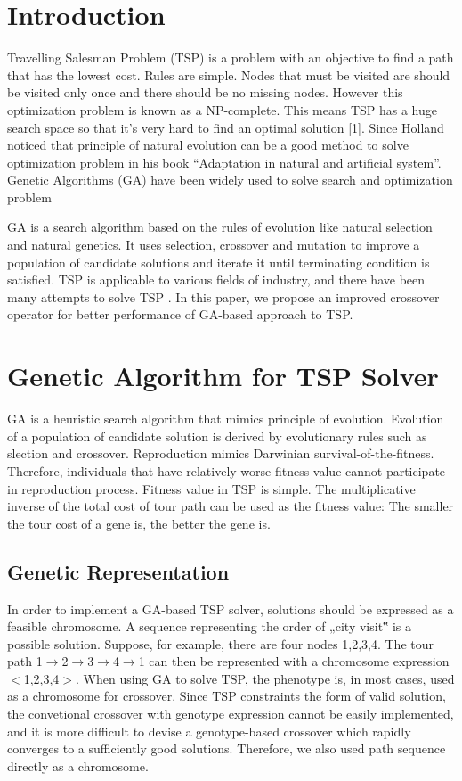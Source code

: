 
\section{Introduction}

Travelling Salesman Problem (TSP) is a problem with an objective to find a path that has the lowest cost. Rules are simple. Nodes that must be visited are should be visited only once and there should be no missing nodes. However this optimization problem is known as a NP-complete. This means TSP has a huge search space so that it's very hard to find an optimal solution [1]. Since Holland noticed that principle of natural evolution can be a good method to solve optimization problem in his book “Adaptation in natural and artificial system”. Genetic Algorithms (GA) have been widely used to solve search and optimization problem

GA is a search algorithm based on the rules of evolution like natural selection and natural genetics\cite{a}. It uses selection, crossover and mutation to improve a population of candidate solutions and iterate it until terminating condition is satisfied. TSP is applicable to various fields of industry, and there have been many attempts to solve TSP \cite{a,b,c}. In this paper, we propose an improved crossover operator for better performance of GA-based approach to TSP.

\section{Genetic Algorithm for TSP Solver}

GA is a heuristic search algorithm that mimics principle of evolution. Evolution of a population of candidate solution is derived by evolutionary rules such as slection and crossover. Reproduction mimics Darwinian survival-of-the-fitness. Therefore, individuals that have relatively worse fitness value cannot participate in reproduction process. Fitness value in TSP is simple. The multiplicative inverse of the total cost of tour path can be used as the fitness value: The smaller the tour cost of a gene is, the better the gene is.

\subsection{Genetic Representation}

In order to implement a GA-based TSP solver, solutions should be expressed as a feasible chromosome. A sequence representing the order of „city visit‟ is a possible solution. Suppose, for example, there are four nodes {1,2,3,4}. The tour path 1$\rightarrow$2$\rightarrow$3$\rightarrow$4$\rightarrow$1 can then be represented with a chromosome expression $<$1,2,3,4$>$. When using GA to solve TSP, the phenotype is, in most cases, used as a chromosome for crossover. Since TSP constraints the form of valid solution, the convetional crossover with genotype expression cannot be easily implemented, and it is more difficult to devise a genotype-based crossover which rapidly converges to a sufficiently good solutions. Therefore, we also used path sequence directly as a chromosome.

